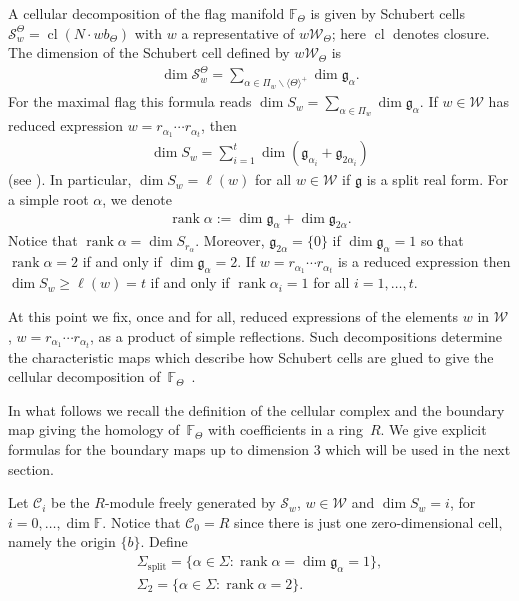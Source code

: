 \documentclass[10pt,a4paper]{amsart}
\numberwithin{equation}{section}
\newcommand{\mgg}{\mathfrak g }
\begin{document}
A cellular decomposition of the flag manifold $\mathbb{F}_\Theta$ is given by Schubert cells ${\mathcal{S}}_w^\Theta=\operatorname{cl}(N\cdot wb_\Theta)$ with $w$ a representative of $w\mathcal{W}_\Theta$; here $\operatorname{cl}$ denotes closure. The dimension of the Schubert cell defined by $w\mathcal{W}_\Theta$ is
\begin{gather*}
\dim {\mathcal{S}}_w^\Theta =\sum_{\alpha\in \Pi_w\backslash \langle \Theta \rangle^+}\dim \mathfrak{g }_\alpha.
\end{gather*}
For the maximal flag this formula reads $\dim S_w=\sum\limits_{\alpha\in \Pi_w}\dim \mathfrak{g }_\alpha$. If $w\in \mathcal{W}$ has reduced expression $w=r_{\alpha _{1}}\cdots r_{\alpha _{t}}$, then
\begin{gather}
\dim S_{w}=\sum_{i=1}^{t}\dim (\mathfrak{g}_{\alpha _{i}}+\mathfrak{g}_{2\alpha _{i}}) \label{eq.dimSw}
\end{gather}
(see \cite[Corollary 2.6]{Wi}). In particular, $\dim S_w=\ell(w)$ for all $w\in \mathcal{W}$ if $\mgg$ is a split real form. For a simple root $\alpha $, we denote
\begin{gather*}
\operatorname{rank}\alpha :=\dim \mathfrak{g}_{\alpha }+\dim \mathfrak{g}_{2\alpha }.
\end{gather*}
Notice that $\operatorname{rank} \alpha=\dim S_{r_{\alpha }}$. Moreover, $\mathfrak{g}_{2\alpha }=\{0\}$ if $\dim \mathfrak{g}_{\alpha }=1$ so that $\operatorname{rank}\alpha =2$ if and only if $\dim \mathfrak{g}_{\alpha }=2$. If $w=r_{\alpha _{1}}\cdots r_{\alpha _{t}}$ is a reduced expression then $\dim S_{w}\geq \ell (w)=t$ if and only if $\operatorname{rank}\alpha_{i}=1$ for all $i=1,\dots,t$.

At this point we fix, once and for all, reduced expressions of the elements $w$ in $\mathcal{W}$, $w=r_{\alpha_1}\cdots r_{\alpha_t}$, as a product of simple reflections. Such decompositions determine the characteristic maps which describe how Schubert cells are glued to give the cellular decomposition of~$\mathbb{F}_\Theta$~\cite{RSM}.

In what follows we recall the definition of the cellular complex and the boundary map giving the homology of~$\mathbb{F}_\Theta$ with coefficients in a ring~$R$. We give explicit formulas for the boundary maps up to dimension $3$ which will be used in the next section.

Let $\mathcal{C}_{i}$ be the $R$-module freely generated by $\mathcal{S}_{w}$, $w\in \mathcal{W}$ and $\dim S_{w}=i$, for $i=0,\ldots,\dim \mathbb{F}$. Notice that $\mathcal{C}_{0}=R$ since there is just one zero-dimensional cell, namely the origin $\{b\}$. Define
\begin{gather*}
\Sigma _{\mathrm{split}} =\{\alpha \in \Sigma \colon \operatorname{rank}\alpha =\dim \mathfrak{g}_{\alpha }=1\}, \\
\Sigma _{2} =\{\alpha \in \Sigma \colon \operatorname{rank}\alpha =2\}.
\end{gather*}
\end{document}
